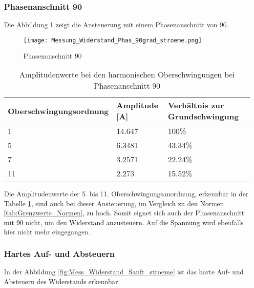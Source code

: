 \subsubsection*{Phasenanschnitt 90\textdegree}

Die Abbildung \ref{fig:Mess_Widerstand_Phas_90grad_stroeme} zeigt die Ansteuerung mit einem Phasenanschnitt von 90\textdegree \hspace{0.02cm}. 

\begin{figure}[ht!]
	\centering
	\texttt{[image: Messung\_Widerstand\_Phas\_90grad\_stroeme.png]}	
	\caption{Phasenanschnitt 90\textdegree}\label{fig:Mess_Widerstand_Phas_90grad_stroeme}
\end{figure}

\begin{table}[ht!]
	\centering
	\begin{tabular}{|l|l|l|}
		\hline
		Oberschwingungsordnung 	& Amplitude [A] & Verhältnis zur Grundschwingung	\\ \hline
		1       				& 14.647   		& 100\%								\\ \hline
		5      					& 6.3481    	& 43.34\%							\\ \hline
		7      					& 3.2571    	& 22.24\%							\\ \hline
		11      				& 2.273    		& 15.52\%							\\ \hline
	\end{tabular}
	\caption{Amplitudenwerte bei den harmonischen Oberschwingungen bei Phasenanschnitt 90\textdegree}\label{tab:Phas_90_Stroeme}
\end{table}

Die Amplitudenwerte der 5. bis 11. Oberschwingungsanordnung, erkennbar in der Tabelle \ref{tab:Phas_90_Stroeme}, sind auch bei dieser Ansteuerung, im Vergleich zu den Normen \ref{tab:Grenzwerte_Normen}, zu hoch. Somit eignet sich auch der Phasenanschnitt mit 90\textdegree \hspace{0.02cm} nicht, um den Widerstand anzusteuern. Auf die Spannung wird ebenfalls hier nicht mehr eingegangen. 


\newpage
\subsubsection*{Hartes Auf- und Absteuern}

In der Abbildung \ref{fig:Mess_Widerstand_Sanft_stroeme} ist das harte Auf- und Absteuern des Widerstands erkennbar. 

